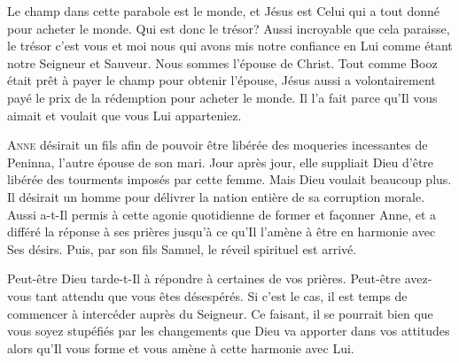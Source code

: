
Le champ dans cette parabole est le monde, et Jésus est Celui
 qui a tout donné pour acheter le monde. Qui est donc le trésor?
 Aussi incroyable que cela paraisse, le trésor c'est vous et moi
 \ocadr nous qui avons mis notre confiance en Lui comme étant notre Seigneur
 et Sauveur.
 Nous sommes l'épouse de Christ.
 Tout comme Booz était prêt à payer le champ pour obtenir l'épouse,
 Jésus aussi a volontairement payé le prix de la rédemption
 pour acheter le monde.
 Il l'a fait parce qu'Il vous aimait et voulait que vous Lui apparteniez. 

\dvrule






\lettrine{A}{nne} désirait un fils afin de pouvoir être libérée
 des moqueries incessantes de Peninna, l'autre épouse de son mari.
 Jour après jour, elle suppliait Dieu d'être libérée des tourments
 imposés par cette femme.
 Mais Dieu voulait beaucoup plus. Il désirait un homme pour délivrer
 la nation entière de sa corruption morale.
 Aussi a-t-Il permis à cette agonie quotidienne de former et fa\c{c}onner Anne,
 et a différé la réponse à ses prières jusqu'à ce qu'Il l'amène
 à être en harmonie avec Ses désirs.
 Puis, par son fils Samuel, le réveil spirituel est arrivé.

Peut-être Dieu tarde-t-Il à répondre à certaines de vos prières.
 Peut-être avez-vous tant attendu que vous êtes désespérés.
 Si c'est le cas, il est temps de commencer à intercéder auprès du Seigneur.
 Ce faisant, il se pourrait bien que vous soyez stupéfiés par les changements
 que Dieu va apporter dans vos attitudes alors qu'Il vous forme
 et vous amène à cette harmonie avec Lui.

